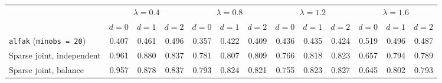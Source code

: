 \begin{center}
\footnotesize
\setlength{\tabcolsep}{3pt}
\begin{tabular}{l*{12}{r}}
\toprule
 & \multicolumn{3}{c}{$\lambda=0.4$} & \multicolumn{3}{c}{$\lambda=0.8$} & \multicolumn{3}{c}{$\lambda=1.2$} & \multicolumn{3}{c}{$\lambda=1.6$} \\
\cmidrule(lr){2-4}\cmidrule(lr){5-7}\cmidrule(lr){8-10}\cmidrule(lr){11-13}
 & $d=0$ & $d=1$ & $d=2$ & $d=0$ & $d=1$ & $d=2$ & $d=0$ & $d=1$ & $d=2$ & $d=0$ & $d=1$ & $d=2$ \\
\midrule
\texttt{alfak} (\texttt{minobs = 20}) & 0.407 & 0.461 & 0.496 & 0.357 & 0.422 & 0.409 & 0.436 & 0.435 & 0.424 & 0.519 & 0.496 & 0.487 \\
Sparse joint, independent & 0.961 & 0.880 & 0.837 & 0.781 & 0.807 & 0.809 & 0.766 & 0.818 & 0.823 & 0.657 & 0.794 & 0.789 \\
Sparse joint, balance & 0.957 & 0.878 & 0.837 & 0.793 & 0.824 & 0.821 & 0.755 & 0.823 & 0.827 & 0.645 & 0.802 & 0.793 \\
\bottomrule
\end{tabular}
\end{center}
